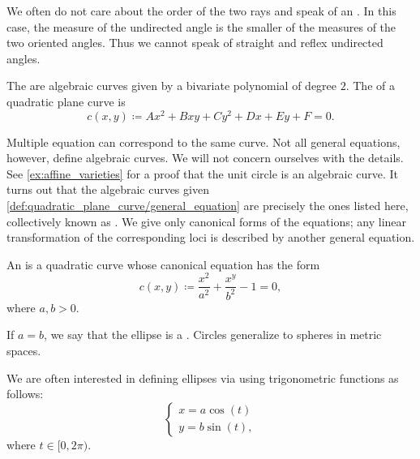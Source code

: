 \begin{definition}
  We often do not care about the order of the two rays and speak of an . In this case, the measure of the undirected angle is the smaller of the measures of the two oriented angles. Thus we cannot speak of straight and reflex undirected angles.
\end{definition}

\begin{definition}\label{def:quadratic_plane_curve}
  The  are algebraic curves given by a bivariate polynomial of degree \( 2 \). The  of a quadratic plane curve is
  \begin{equation}\label{def:quadratic_plane_curve/general_equation}
    c(x, y) \coloneqq A x^2 + B xy + C y^2 + Dx + Ey + F = 0.
  \end{equation}

  Multiple equation can correspond to the same curve. Not all general equations, however, define algebraic curves. We will not concern ourselves with the details. See \cref{ex:affine_varieties} for a proof that the unit circle is an algebraic curve. It turns out that the algebraic curves given \cref{def:quadratic_plane_curve/general_equation} are precisely the ones listed here, collectively known as . We give only canonical forms of the equations; any linear transformation of the corresponding loci is described by another general equation.

  \begin{defenum}
     An  is a quadratic curve whose canonical equation has the form
    \begin{equation}\label{def:quadratic_plane_curve/ellipse/canonical_equation}
      c(x, y) \coloneqq \frac {x^2} {a^2} + \frac {x^y} {b^2} - 1 = 0,
    \end{equation}
    where \( a, b > 0 \).

    If \( a = b \), we say that the ellipse is a . Circles generalize to spheres in metric spaces.

    We are often interested in defining ellipses via  using trigonometric functions as follows:
    \begin{equation}\label{def:quadratic_plane_curve/ellipse/parametric_equations}
      \begin{cases}
        x = a \cos(t) \\
        y = b \sin(t),
      \end{cases}
    \end{equation}
    where \( t \in [0, 2\pi) \).


\end{defenum}
\end{definition}
